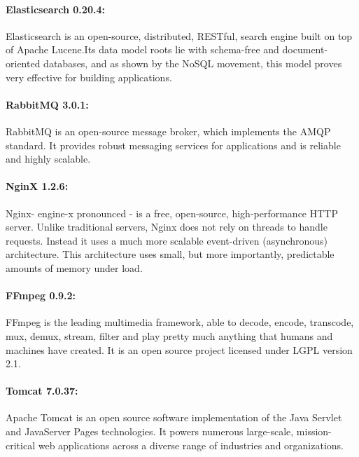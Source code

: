 \paragraph{Elasticsearch 0.20.4:} Elasticsearch is an open-source, distributed, RESTful, search engine built on top of Apache Lucene.Its data model roots lie with schema-free and document-oriented databases, and as shown by the NoSQL movement, this model proves very effective for building applications.

\paragraph{RabbitMQ 3.0.1:} RabbitMQ is an open-source message broker, which implements the AMQP standard. It provides  robust messaging services for applications and is reliable and highly scalable.

\paragraph{NginX 1.2.6:} Nginx- engine-x pronounced - is a free, open-source, high-performance \ac{HTTP} server. Unlike traditional servers, Nginx does not rely on threads to handle requests. Instead it uses a much more scalable event-driven (asynchronous) architecture. This architecture uses small, but more importantly, predictable amounts of memory under load.

\paragraph{FFmpeg 0.9.2:} FFmpeg is the leading multimedia framework, able to decode, encode, transcode, mux, demux, stream, filter and play pretty much anything that humans and machines have created. It is an open source project licensed under LGPL version 2.1.

\paragraph{Tomcat 7.0.37:} Apache Tomcat is an open source software implementation of the Java Servlet and JavaServer Pages technologies. It powers numerous large-scale, mission-critical web applications across a diverse range of industries and organizations.


